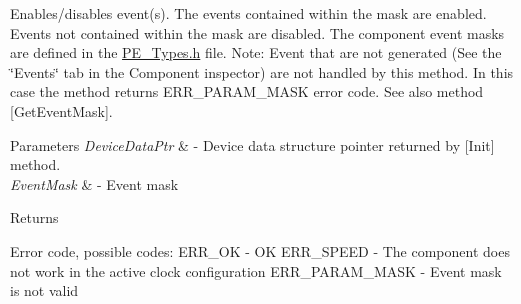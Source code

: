 Enables/disables event(s). The events contained within the mask are enabled. Events not contained within the mask are disabled. The component event masks are defined in the \hyperlink{_p_e___types_8h}{P\+E\+\_\+\+Types.\+h} file. Note\+: Event that are not generated (See the \char`\"{}\+Events\char`\"{} tab in the Component inspector) are not handled by this method. In this case the method returns E\+R\+R\+\_\+\+P\+A\+R\+A\+M\+\_\+\+M\+A\+SK error code. See also method \mbox{[}Get\+Event\+Mask\mbox{]}. 


\begin{DoxyParams}{Parameters}
{\em Device\+Data\+Ptr} & -\/ Device data structure pointer returned by \mbox{[}Init\mbox{]} method. \\
\hline
{\em Event\+Mask} & -\/ Event mask \\
\hline
\end{DoxyParams}
\begin{DoxyReturn}{Returns}

\begin{DoxyItemize}
\item Error code, possible codes\+: E\+R\+R\+\_\+\+OK -\/ OK E\+R\+R\+\_\+\+S\+P\+E\+ED -\/ The component does not work in the active clock configuration E\+R\+R\+\_\+\+P\+A\+R\+A\+M\+\_\+\+M\+A\+SK -\/ Event mask is not valid 
\end{DoxyItemize}
\end{DoxyReturn}
